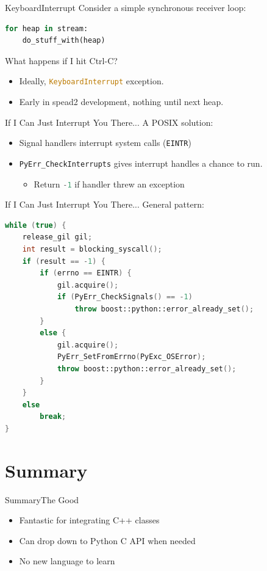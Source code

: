 \documentclass{beamer}
\def\linlinep{\lstinline[basicstyle=\ttfamily,language=python]}
\def\linlinec{\lstinline[basicstyle=\ttfamily,language=c++]}
\begin{document}
\begin{frame}[fragile]{KeyboardInterrupt}
  Consider a simple synchronous receiver loop:
  \begin{lstlisting}[language=python]
for heap in stream:
    do_stuff_with(heap)
  \end{lstlisting}
  What happens if I hit Ctrl-C?
  \begin{itemize}[<+->]
    \item Ideally, \linlinep{KeyboardInterrupt} exception.
    \item Early in spead2 development, \alert{nothing} until next heap.
  \end{itemize}
\end{frame}

\begin{frame}{If I Can Just Interrupt You There...}
  A POSIX solution:
  \begin{itemize}
    \item Signal handlers interrupt system calls (\linlinec"EINTR")
    \item \linlinec"PyErr_CheckInterrupts" gives interrupt handles a chance to
      run.
    \begin{itemize}
      \item Return \linlinec"-1" if handler threw an exception
    \end{itemize}
  \end{itemize}
\end{frame}

\begin{frame}[fragile=singleslide]{If I Can Just Interrupt You There...}
  General pattern:
  \begin{lstlisting}[language=c++]
while (true) {
    release_gil gil;
    int result = blocking_syscall();
    if (result == -1) {
        if (errno == EINTR) {
            gil.acquire();
            if (PyErr_CheckSignals() == -1)
                throw boost::python::error_already_set();
        }
        else {
            gil.acquire();
            PyErr_SetFromErrno(PyExc_OSError);
            throw boost::python::error_already_set();
        }
    }
    else
        break;
}
  \end{lstlisting}
\end{frame}

\section*{Summary}

\begin{frame}[<+->]{Summary}{The Good}
  \begin{itemize}
    \item Fantastic for integrating C++ classes
    \item Can drop down to Python C API when needed
    \item No new language to learn
  \end{itemize}
\end{frame}
\end{document}
